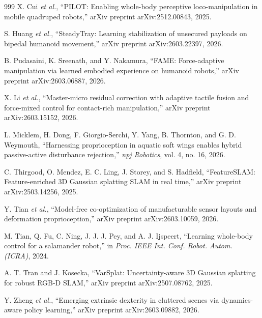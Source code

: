 ﻿\documentclass[11pt,a4paper]{article}
\begin{document}
\begin{thebibliography}{999}
X. Cui \textit{et al.}, ``{PILOT}: Enabling whole-body perceptive loco-manipulation in mobile quadruped robots,'' arXiv preprint arXiv:2512.00843, 2025.

S. Huang \textit{et al.}, ``{SteadyTray}: Learning stabilization of unsecured payloads on bipedal humanoid movement,'' arXiv preprint arXiv:2603.22397, 2026.

B. Pudasaini, K. Sreenath, and Y. Nakamura, ``{FAME}: Force-adaptive manipulation via learned embodied experience on humanoid robots,'' arXiv preprint arXiv:2603.06887, 2026.

X. Li \textit{et al.}, ``Master-micro residual correction with adaptive tactile fusion and force-mixed control for contact-rich manipulation,'' arXiv preprint arXiv:2603.15152, 2026.

L. Micklem, H. Dong, F. Giorgio-Serchi, Y. Yang, B. Thornton, and G. D. Weymouth, ``Harnessing proprioception in aquatic soft wings enables hybrid passive-active disturbance rejection,'' \textit{npj Robotics}, vol. 4, no. 16, 2026.

C. Thirgood, O. Mendez, E. C. Ling, J. Storey, and S. Hadfield, ``{FeatureSLAM}: Feature-enriched {3D} Gaussian splatting {SLAM} in real time,'' arXiv preprint arXiv:2503.14256, 2025.

Y. Tian \textit{et al.}, ``Model-free co-optimization of manufacturable sensor layouts and deformation proprioception,'' arXiv preprint arXiv:2603.10059, 2026.

M. Tian, Q. Fu, C. Ning, J. J. J. Pey, and A. J. Ijspeert, ``Learning whole-body control for a salamander robot,'' in \textit{Proc. IEEE Int. Conf. Robot. Autom. (ICRA)}, 2024.

A. T. Tran and J. Kosecka, ``{VarSplat}: Uncertainty-aware {3D} Gaussian splatting for robust {RGB-D} {SLAM},'' arXiv preprint arXiv:2507.08762, 2025.

Y. Zheng \textit{et al.}, ``Emerging extrinsic dexterity in cluttered scenes via dynamics-aware policy learning,'' arXiv preprint arXiv:2603.09882, 2026.

\end{thebibliography}
\end{document}
